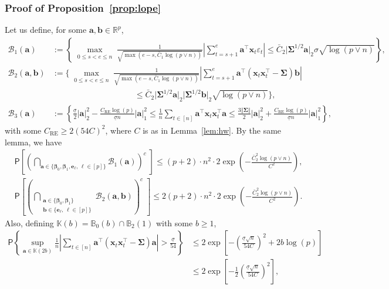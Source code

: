 \documentclass[11pt, a4paper]{article}
\newcommand{\mbf}{\mathbf}
\newcommand{\mc}{\mathcal}
\newcommand{\vep}{\varepsilon}
\renewcommand{\l}{\left}
\renewcommand{\r}{\right}
\newcommand{\p}{\mathsf{P}}
\newcommand{\R}{\mathbb{R}}
\theoremstyle{definition}
\theoremstyle{definition}
\theoremstyle{definition}
\theoremstyle{definition}
\theoremstyle{definition}
\theoremstyle{remark}
\theoremstyle{definition}
\theoremstyle{definition}
\theoremstyle{definition}
\begin{document}
\subsubsection{Proof of Proposition~\ref{prop:lope}}

Let us define, for some $\mbf a, \mbf b \in \R^p$,
\begin{align*}
\mc B_1(\mbf a) &:= \l\{ \max_{\substack{ 0 \le s < e \le n}} \frac{1}{\sqrt{\max(e - s, \bar{C}_1\log(p \vee n))}} \l\vert \sum_{t = s + 1}^e \mbf a^\top \mbf x_t \vep_t \r\vert \le \bar{C}_2 \vert \bm\Sigma^{1/2} \mbf a \vert_2 \sigma \sqrt{\log(p \vee n)} \r\},
\\
\mc B_2(\mbf a, \mbf b) &:= \Biggl\{ \max_{\substack{ 0 \le s < e \le n}} \frac{1}{\sqrt{\max(e - s, \bar{C}_1\log(p \vee n))}} \l\vert \sum_{t = s + 1}^e \mbf a^\top (\mbf x_t \mbf x_t^\top - \bm\Sigma) \mbf b \r\vert 
\\
& \qquad \qquad \qquad \qquad \qquad  \le \bar{C}_2 \vert \bm\Sigma^{1/2} \mbf a \vert_2 \vert \bm\Sigma^{1/2} \mbf b \vert_2 \sqrt{\log(p \vee n)} \Biggr\},
\\
\mc B_3(\mbf a) &:= \l\{ \frac{\underline{\sigma}}{2} \vert \mbf a \vert_2^2 - \frac{C_{\text{RE}} \log(p)}{\underline{\sigma} n} \vert \mbf a \vert_1^2 \le \frac{1}{n} \sum_{t \in [n]} \mbf a^\top \mbf x_t \mbf x_t^\top \mbf a \le  \frac{3\Vert \bm\Sigma \Vert}{2} \vert \mbf a \vert_2^2 + \frac{C_{\text{RE}} \log(p)}{\underline{\sigma} n} \vert \mbf a \vert_1^2 \r\},
\end{align*}
with some $C_{\text{RE}} \ge 2 (54 C)^2$, where $C$ is as in Lemma~\ref{lem:hw}.
By the same lemma, we have 
\begin{align*}
& \p\l[ \l( \bigcap_{\mbf a \in \{\bm\beta_0, \bm\beta_1, \mbf e_\ell, \, \ell \in [p] \}} \mc B_1(\mbf a) \r)^c \; \r]
\le (p + 2) \cdot n^2 \cdot 2 \exp\l( - \frac{\bar{C}_2^2 \log(p \vee n)}{C^2} \r),
\\
& \p\l[ \l( \bigcap_{\substack{\mbf a \in \{\bm\beta_0, \bm\beta_1 \} \\ \mbf b \in \{\mbf e_\ell, \, \ell \in [p]\}}} \mc B_2(\mbf a, \mbf b) \r)^c \; \r]
\le 2(p + 2) \cdot n^2 \cdot 2 \exp\l( - \frac{\bar{C}_2^2 \log(p \vee n)}{C^2} \r).
\end{align*}
Also, defining $\mathbb{K}(b) = \mathbb{B}_0(b) \cap \mathbb{B}_2(1)$ with some $b \ge 1$,
\begin{align*}
\p\l\{ \sup_{\mbf a \in \mathbb{K}(2b)} \frac{1}{n} \l\vert \sum_{t \in [n]} \mbf a^\top(\mbf x_t\mbf x_t^\top - \bm\Sigma) \mbf a \r\vert > \frac{\underline{\sigma}}{54} \r\} &\le 2 \exp\l[ - \l( \frac{\underline{\sigma}\sqrt{n}}{54C} \r)^2 + 2 b \log(p) \r] 
\\
& \le 2 \exp\l[ - \frac{1}{2} \l( \frac{\underline{\sigma}\sqrt{n}}{54C} \r)^2 \r],
\end{align*}
\end{document}
